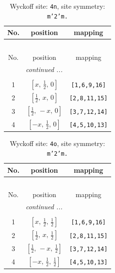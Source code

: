 \documentclass[fleqn,8pt]{jsarticle}
\begin{document}
\renewcommand{\arraystretch}{1.2}
\begin{longtable}{ccc}
\caption{Wyckoff site: {\tt 4n}, site symmetry: {\tt m'2'm.}}
 \\
 \hline \hline
No. & position & mapping \\ \hline \endfirsthead

\multicolumn{2}{l}{\tablename\ \thetable{}} \\
 \hline \hline
No. & position & mapping \\ \hline \endhead

 \hline \hline
\multicolumn{2}{r}{\footnotesize\it continued ...} \\ \endfoot

 \hline \hline
\multicolumn{2}{r}{} \\ \endlastfoot

1 & $\left[ x,\, \frac{1}{2},\, 0 \right]$ & {\tt [1,6,9,16]} \\ \hline
2 & $\left[ \frac{1}{2},\, x,\, 0 \right]$ & {\tt [2,8,11,15]} \\ \hline
3 & $\left[ \frac{1}{2},\, - x,\, 0 \right]$ & {\tt [3,7,12,14]} \\ \hline
4 & $\left[ - x,\, \frac{1}{2},\, 0 \right]$ & {\tt [4,5,10,13]} \\
\end{longtable}
\renewcommand{\arraystretch}{1.2}
\begin{longtable}{ccc}
\caption{Wyckoff site: {\tt 4o}, site symmetry: {\tt m'2'm.}}
 \\
 \hline \hline
No. & position & mapping \\ \hline \endfirsthead

\multicolumn{2}{l}{\tablename\ \thetable{}} \\
 \hline \hline
No. & position & mapping \\ \hline \endhead

 \hline \hline
\multicolumn{2}{r}{\footnotesize\it continued ...} \\ \endfoot

 \hline \hline
\multicolumn{2}{r}{} \\ \endlastfoot

1 & $\left[ x,\, \frac{1}{2},\, \frac{1}{2} \right]$ & {\tt [1,6,9,16]} \\ \hline
2 & $\left[ \frac{1}{2},\, x,\, \frac{1}{2} \right]$ & {\tt [2,8,11,15]} \\ \hline
3 & $\left[ \frac{1}{2},\, - x,\, \frac{1}{2} \right]$ & {\tt [3,7,12,14]} \\ \hline
4 & $\left[ - x,\, \frac{1}{2},\, \frac{1}{2} \right]$ & {\tt [4,5,10,13]} \\
\end{longtable}
\end{document}
